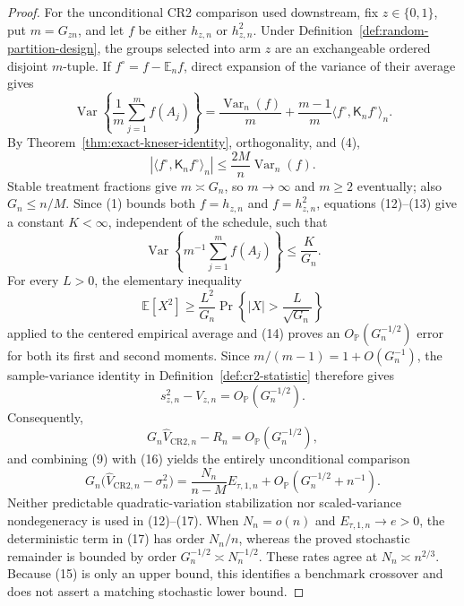 \documentclass{article}
\begin{document}
\begin{proof}
For the unconditional CR2 comparison used downstream, fix \(z\in\{0,1\}\), put \(m=G_{zn}\), and let \(f\) be either \(h_{z,n}\) or \(h_{z,n}^2\).  Under Definition~\ref{def:random-partition-design}, the groups selected into arm \(z\) are an exchangeable ordered disjoint \(m\)-tuple.  If \(f^\circ=f-\mathbb E_nf\), direct expansion of the variance of their average gives
\[
\operatorname{Var}\!\left\{\frac1m\sum_{j=1}^m f(A_j)\right\}
=\frac{\operatorname{Var}_n(f)}m
+\frac{m-1}{m}\langle f^\circ,\mathsf K_nf^\circ\rangle_n. \tag{12}
\]
By Theorem~\ref{thm:exact-kneser-identity}, orthogonality, and (4),
\[
\left|\langle f^\circ,\mathsf K_nf^\circ\rangle_n\right|
\leq\frac{2M}{n}\operatorname{Var}_n(f).                  \tag{13}
\]
Stable treatment fractions give \(m\asymp G_n\), so \(m\to\infty\) and \(m\geq2\) eventually; also \(G_n\leq n/M\).  Since (1) bounds both \(f=h_{z,n}\) and \(f=h_{z,n}^2\), equations (12)--(13) give a constant \(K<\infty\), independent of the schedule, such that
\[
\operatorname{Var}\!\left\{m^{-1}\sum_{j=1}^m f(A_j)\right\}
\leq\frac{K}{G_n}.                                         \tag{14}
\]
For every \(L>0\), the elementary inequality
\[
\mathbb E[X^2]\geq \frac{L^2}{G_n}
 \Pr\!\left\{|X|>\frac{L}{\sqrt{G_n}}\right\}
\]
applied to the centered empirical average and (14) proves an \(O_{\mathbb P}(G_n^{-1/2})\) error for both its first and second moments.  Since \(m/(m-1)=1+O(G_n^{-1})\), the sample-variance identity in Definition~\ref{def:cr2-statistic} therefore gives
\[
s_{z,n}^2-V_{z,n}=O_{\mathbb P}(G_n^{-1/2}).                \tag{15}
\]
Consequently,
\[
G_n\widehat V_{\mathrm{CR2},n}-R_n
=O_{\mathbb P}(G_n^{-1/2}),                                \tag{16}
\]
and combining (9) with (16) yields the entirely unconditional comparison
\[
G_n\bigl(\widehat V_{\mathrm{CR2},n}-\sigma_n^2\bigr)
=\frac{N_n}{n-M}E_{\tau,1,n}
 +O_{\mathbb P}(G_n^{-1/2}+n^{-1}).                        \tag{17}
\]
Neither predictable quadratic-variation stabilization nor scaled-variance nondegeneracy is used in (12)--(17).  When \(N_n=o(n)\) and \(E_{\tau,1,n}\to e>0\), the deterministic term in (17) has order \(N_n/n\), whereas the proved stochastic remainder is bounded by order \(G_n^{-1/2}\asymp N_n^{-1/2}\).  These rates agree at \(N_n\asymp n^{2/3}\).  Because (15) is only an upper bound, this identifies a benchmark crossover and does not assert a matching stochastic lower bound.
\end{proof}
\end{document}
